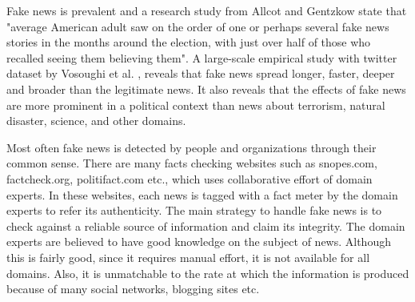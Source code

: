 \documentclass[a4paper, 11pt]{article}
\begin{document}
Fake news is prevalent and a research study from Allcot and Gentzkow \cite{Allcott2017} state that "average American adult saw on the order of one or perhaps several fake news stories in the months around the election, with just over half of those who recalled seeing them believing them". A large-scale empirical study with twitter dataset by Vosoughi et al. \cite{Vosoughi1146}, reveals that fake news spread longer, faster, deeper and broader than the legitimate news. It also reveals that the effects of fake news are more prominent in a political context than news about terrorism, natural disaster, science, and other domains.

Most often fake news is detected by people and organizations through their common sense. There are many facts checking websites such as snopes.com, factcheck.org, politifact.com etc., which uses collaborative effort of domain experts. In these websites, each news is tagged with a fact meter by the domain experts to refer its authenticity. The main strategy to handle fake news is to check against a reliable source of information and claim its integrity. The domain experts are believed to have good knowledge on the subject of news. Although this is fairly good, since it requires manual effort, it is not available for all domains. Also, it is unmatchable to the rate at which the information is produced because of many social networks, blogging sites etc.
\end{document}
